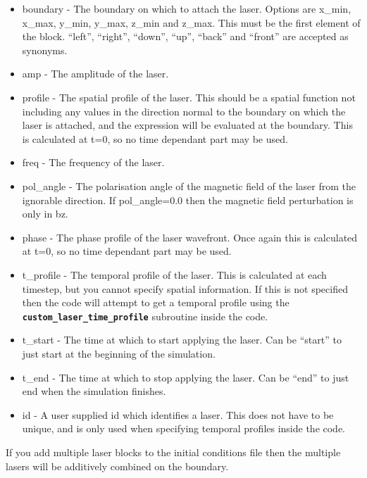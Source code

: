 \documentclass[12pt,a4paper]{article}
\newcommand{\inlinecode}[1]{{\color{warwickred} \bf\texttt{#1}}}
\begin{document}
\begin{itemize}
\item boundary - The boundary on which to attach the laser. Options are x\_min,
  x\_max, y\_min, y\_max, z\_min and z\_max. This must be the first element of
  the block. ``left'', ``right'', ``down'', ``up'', ``back'' and ``front'' are
  accepted as synonyms.
\item amp - The amplitude of the laser.
\item profile - The spatial profile of the laser. This should be a spatial
  function not including any values in the direction normal to the boundary
  on which the laser is attached, and the expression will be evaluated at the
  boundary. This is calculated at t=0, so no time dependant part may be used.
\item freq - The frequency of the laser.
\item pol\_angle - The polarisation angle of the magnetic field of the laser
  from the ignorable direction. If pol\_angle=0.0 then the magnetic field
  perturbation is only in bz.
\item phase - The phase profile of the laser wavefront. Once again this is
  calculated at t=0, so no time dependant part may be used.
\item t\_profile - The temporal profile of the laser. This is calculated at
  each timestep, but you cannot specify spatial information. If this is not
  specified then the code will attempt to get a temporal profile using the
  \inlinecode{custom\_laser\_time\_profile} subroutine inside the code.
\item t\_start - The time at which to start applying the laser. Can be
  ``start'' to just start at the beginning of the simulation.
\item t\_end - The time at which to stop applying the laser. Can be ``end'' to
  just end when the simulation finishes.
\item id - A user supplied id which identifies a laser. This does not have to
  be unique, and is only used when specifying temporal profiles inside the
  code.
\end{itemize}

If you add multiple laser blocks to the initial conditions file then the
multiple lasers will be additively combined on the boundary.
\end{document}
